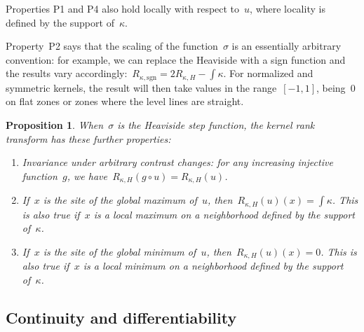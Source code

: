 \documentclass[12pt]{article}                  %
\newtheorem{proposition}{Proposition}
\begin{document}
Properties P1 and P4 also hold locally with respect to~$u$, where locality is
defined by the support of~$\kappa$.

Property~P2 says that the scaling of the function~$\sigma$ is an
essentially arbitrary convention: for example, we can replace the Heaviside
with a sign function and the results vary
accordingly:~$R_{\kappa,\mathrm{sgn}}=2R_{\kappa,H}-\int\kappa$.  For
normalized and symmetric kernels, the result will then take values in the
range~$[-1,1]$, being~$0$ on flat zones or zones where the level lines are
straight.

\begin{proposition}
	When~$\sigma$ is the Heaviside step function, the kernel rank
	transform has these further properties:
	\begin{enumerate}
		\item[\bf H1] Invariance under arbitrary contrast changes: for
			any increasing injective function~$g$, we
			have~$R_{\kappa,H}(g\circ u)=R_{\kappa,H}(u)$.
		\item[\bf H2] If~$x$ is the site of the global maximum of~$u$,
			then~$R_{\kappa,H}(u)(x)=\int\kappa$.
			This is also true if~$x$ is a local maximum on a
			neighborhood defined by the support of~$\kappa$.
		\item[\bf H3] If~$x$ is the site of the global
			minimum of~$u$,
			then~$R_{\kappa,H}(u)(x)=0$.
			This is also true if~$x$ is a local minimum on a
			neighborhood defined by the support of~$\kappa$.
	\end{enumerate}
\end{proposition}


%
%
%
%


\subsection{Continuity and differentiability}
\end{document}
